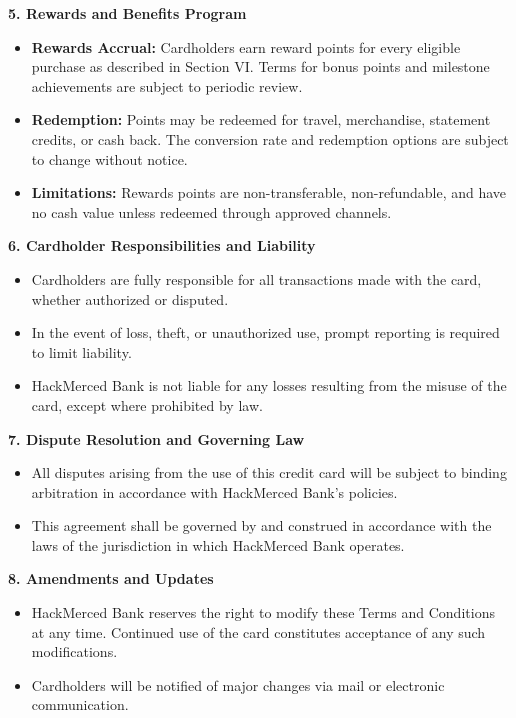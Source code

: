 \documentclass[12pt,a4paper]{article}
\begin{document}
\begin{spacing}{1.1}
\vspace{1em}
\textbf{5. Rewards and Benefits Program}\\[1ex]
\begin{itemize}
    \item \textbf{Rewards Accrual:} Cardholders earn reward points for every eligible purchase as described in Section VI. Terms for bonus points and milestone achievements are subject to periodic review.
    \item \textbf{Redemption:} Points may be redeemed for travel, merchandise, statement credits, or cash back. The conversion rate and redemption options are subject to change without notice.
    \item \textbf{Limitations:} Rewards points are non-transferable, non-refundable, and have no cash value unless redeemed through approved channels.
\end{itemize}

\vspace{1em}
\textbf{6. Cardholder Responsibilities and Liability}\\[1ex]
\begin{itemize}
    \item Cardholders are fully responsible for all transactions made with the card, whether authorized or disputed.
    \item In the event of loss, theft, or unauthorized use, prompt reporting is required to limit liability.
    \item HackMerced Bank is not liable for any losses resulting from the misuse of the card, except where prohibited by law.
\end{itemize}

\vspace{1em}
\textbf{7. Dispute Resolution and Governing Law}\\[1ex]
\begin{itemize}
    \item All disputes arising from the use of this credit card will be subject to binding arbitration in accordance with HackMerced Bank’s policies.
    \item This agreement shall be governed by and construed in accordance with the laws of the jurisdiction in which HackMerced Bank operates.
\end{itemize}

\vspace{1em}
\textbf{8. Amendments and Updates}\\[1ex]
\begin{itemize}
    \item HackMerced Bank reserves the right to modify these Terms and Conditions at any time. Continued use of the card constitutes acceptance of any such modifications.
    \item Cardholders will be notified of major changes via mail or electronic communication.
\end{itemize}


\end{spacing}
\end{document}
